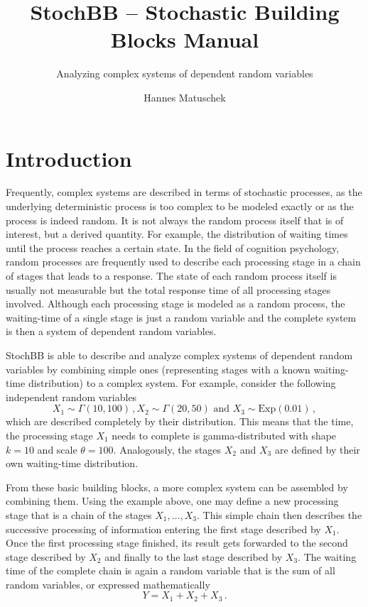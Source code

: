 \documentclass[a4paper, 10pt]{paper}
\title{StochBB -- Stochastic Building Blocks Manual}
\subtitle{Analyzing complex systems of dependent random variables}
\author{Hannes Matuschek}
\begin{document}
\maketitle
 
\section{Introduction} \label{sec:intro}
Frequently, complex systems are described in terms of stochastic processes, as the
underlying deterministic process is too complex to be modeled exactly or as the
process is indeed random. It is not always the random process itself that is of 
interest, but a derived quantity. For example, the distribution of waiting times until the
process reaches a certain state. In the field of cognition psychology, random processes are frequently used to
describe each processing stage in a chain of stages that leads to a response. The state of
each random process itself is usually not measurable but the total response time of all processing 
stages involved. Although each processing stage is modeled as a random process, the waiting-time
of a single stage is just a random variable and the complete system is then a system of dependent random 
variables.

StochBB is able to describe and analyze complex systems of dependent random variables
by combining simple ones (representing stages with a known waiting-time distribution) to
a complex system. For example, consider the following independent random variables
\begin{equation}
  X_1 \sim \Gamma(10, 100)\,, X_2 \sim \Gamma(20, 50)\text{ and } X_3 \sim \text{Exp}(0.01)\,,\nonumber
\end{equation}
which are described completely by their distribution. This means that the time, the
processing stage $X_1$ needs to complete is gamma-distributed with shape $k=10$ and scale
$\theta=100$. Analogously, the stages $X_2$ and $X_3$ are defined by their own waiting-time 
distribution.

From these basic building blocks, a more complex system can be assembled by
combining them. Using the example above, one may define a new processing stage that is a chain of
the stages $X_1,\dots,X_3$. This simple chain then describes the successive
processing of information entering the first stage described by $X_1$.
Once the first processing stage finished, its result gets forwarded to the second stage described
by $X_2$ and finally to the last stage described by $X_3$. The waiting time of the
complete chain is again a random variable that is the sum of all random variables,
or expressed mathematically
\begin{equation}
 Y = X_1 + X_2 + X_3\,. \nonumber
\end{equation}
\end{document}
